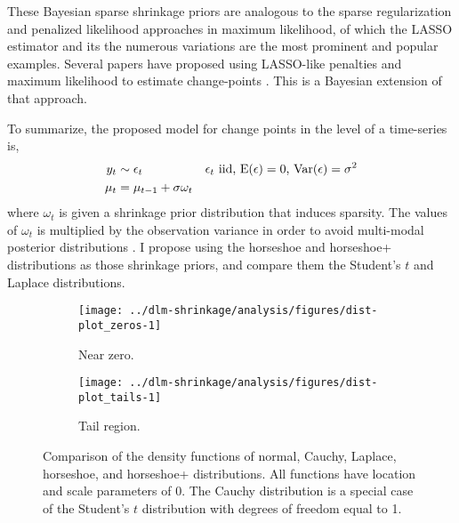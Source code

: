 These Bayesian sparse shrinkage priors are analogous to the sparse regularization and penalized likelihood approaches in maximum likelihood, of which the LASSO estimator \parencite{Tibshirani1996} and its the numerous variations are the most prominent and popular examples.
Several papers have proposed using LASSO-like penalties and maximum likelihood to estimate change-points \parencites{TibshiraniEtAl2005}{HarchaouiLevy-Leduc2010}{ChanYauZhang2014}.
This is a Bayesian extension of that approach.

To summarize, the proposed model for change points in the level of a time-series is,
\begin{align}
  \label{dlm:eq:16}
  y_{t} & \sim \epsilon_{t} & \text{$\epsilon_{t}$ iid, $\operatorname{E}(\epsilon) = 0$, $\operatorname{Var}(\epsilon) = \sigma^{2}$} \\
  \mu_{t} &= \mu_{t - 1} + \sigma \omega_{t}
\end{align}
where $\omega_{t}$ is given a shrinkage prior distribution that induces sparsity.
The values of $\omega_{t}$ is multiplied by the observation variance in order to avoid multi-modal posterior distributions \parencite[8]{PolsonScott2010}.
I propose using the horseshoe and horseshoe+ distributions as those shrinkage priors, and compare them the Student's $t$ and Laplace distributions.

\begin{figure}[!htpb]
 \begin{subfigure}[b]{\linewidth}
   \texttt{[image: ../dlm-shrinkage/analysis/figures/dist-plot\_zeros-1]}
   \caption{Near zero.}
 \end{subfigure}
 \begin{subfigure}[b]{\linewidth}
    \texttt{[image: ../dlm-shrinkage/analysis/figures/dist-plot\_tails-1]}
    \caption{Tail region.}
 \end{subfigure}
  \caption[Comparison of the density functions of normal, Cauchy, Laplace, horseshoe, and horseshoe+ distributions.]{
    Comparison of the density functions of normal, Cauchy, Laplace, horseshoe, and horseshoe+ distributions.
    All functions have location and scale parameters of 0.
    The Cauchy distribution is a special case of the Student's $t$ distribution with degrees of freedom equal to 1.
  }
  \label{dlm:fig:density}
\end{figure}


